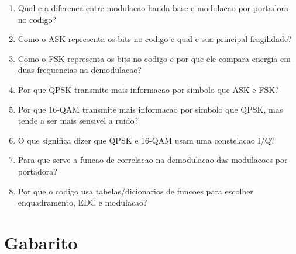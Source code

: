 \documentclass[12pt,a4paper]{article}
\begin{document}
\begin{enumerate}
  \item Qual e a diferenca entre modulacao banda-base e modulacao por portadora no codigo?

  \item Como o ASK representa os bits no codigo e qual e sua principal fragilidade?

  \item Como o FSK representa os bits no codigo e por que ele compara energia em duas frequencias na demodulacao?

  \item Por que QPSK transmite mais informacao por simbolo que ASK e FSK?

  \item Por que 16-QAM transmite mais informacao por simbolo que QPSK, mas tende a ser mais sensivel a ruido?

  \item O que significa dizer que QPSK e 16-QAM usam uma constelacao I/Q?

  \item Para que serve a funcao de correlacao na demodulacao das modulacoes por portadora?

  \item Por que o codigo usa tabelas/dicionarios de funcoes para escolher enquadramento, EDC e modulacao?
\end{enumerate}

\newpage

\section*{Gabarito}
\end{document}
